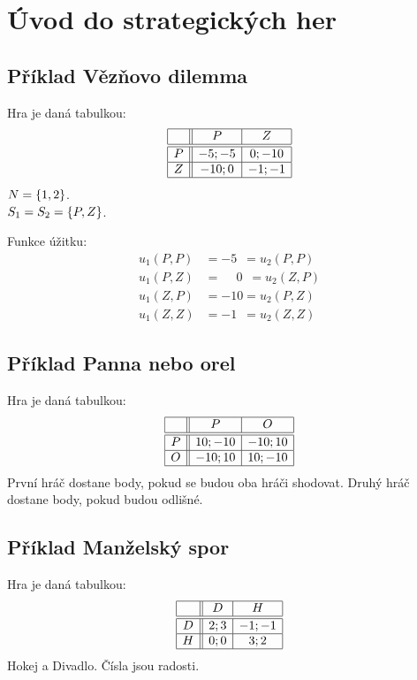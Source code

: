 \section{Úvod do strategických her}

\subsection{Příklad Vězňovo dilemma}
Hra je daná tabulkou:
\[
\begin{array}{|c| |c|c|}
    \hline
    & P & Z \\ \hline \hline
    P & -5;-5 & 0;-10 \\ \hline
    Z & -10;0 & -1;-1 \\ \hline
\end{array}
\]
$N = \left\lbrace 1,2 \right\rbrace$.\\
$S_1 = S_2 = \left\lbrace P, Z \right\rbrace$.

Funkce úžitku:
\begin{align*}
    u_1(P, P) &= -5\phantom{0} = u_2(P, P) \\
    u_1(P, Z) &= \phantom{-}0\phantom{0} = u_2(Z, P) \\
    u_1(Z, P) &= -10 = u_2(P, Z) \\
    u_1(Z, Z) &= -1\phantom{0} = u_2(Z, Z)
\end{align*}

\subsection{Příklad Panna nebo orel}
Hra je daná tabulkou:
\[
\begin{array}{|c| |c|c|}
    \hline
    & P & O \\ \hline \hline
    P & 10;-10 & -10;10 \\ \hline
    O & -10;10 & 10;-10 \\ \hline
\end{array}
\]
První hráč dostane body, pokud se budou oba hráči shodovat. Druhý hráč dostane body, pokud budou odlišné.

\subsection{Příklad Manželský spor}
Hra je daná tabulkou:
\[
\begin{array}{|c| |c|c|}
    \hline
    & D & H \\ \hline \hline
    D & 2;3 & -1;-1 \\ \hline
    H & 0;0 & 3;2 \\ \hline
\end{array}
\]
Hokej a Divadlo. Čísla jsou radosti.

